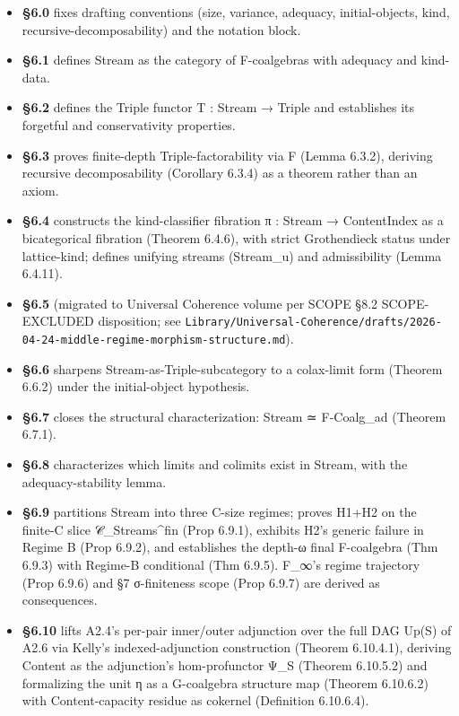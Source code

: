 \documentclass[11pt, openany]{book}
\begin{document}
\begin{itemize}
\item \textbf{§6.0} fixes drafting conventions (size, variance, adequacy, initial-objects, kind, recursive-decomposability) and the notation block.
\item \textbf{§6.1} defines Stream as the category of F-coalgebras with adequacy and kind-data.
\item \textbf{§6.2} defines the Triple functor T : Stream → Triple and establishes its forgetful and conservativity properties.
\item \textbf{§6.3} proves finite-depth Triple-factorability via F (Lemma 6.3.2), deriving recursive decomposability (Corollary 6.3.4) as a theorem rather than an axiom.
\item \textbf{§6.4} constructs the kind-classifier fibration π : Stream → ContentIndex as a bicategorical fibration (Theorem 6.4.6), with strict Grothendieck status under lattice-kind; defines unifying streams (Stream\_\allowbreak{}u) and admissibility (Lemma 6.4.11).
\item \textbf{§6.5} (migrated to Universal Coherence volume per SCOPE §8.2 SCOPE-EXCLUDED disposition; see \texttt{Library/Universal-Coherence/drafts/2026-04-24-middle-regime-morphism-structure.md}).
\item \textbf{§6.6} sharpens Stream-as-Triple-subcategory to a colax-limit form (Theorem 6.6.2) under the initial-object hypothesis.
\item \textbf{§6.7} closes the structural characterization: Stream ≃ F-Coalg\_\allowbreak{}ad (Theorem 6.7.1).
\item \textbf{§6.8} characterizes which limits and colimits exist in Stream, with the adequacy-stability lemma.
\item \textbf{§6.9} partitions Stream into three C-size regimes; proves H1+H2 on the finite-C slice 𝒞\_\allowbreak{}Streams\textasciicircum{}{fin} (Prop 6.9.1), exhibits H2's generic failure in Regime B (Prop 6.9.2), and establishes the depth-ω final F-coalgebra (Thm 6.9.3) with Regime-B conditional (Thm 6.9.5). F\_\allowbreak{}∞'s regime trajectory (Prop 6.9.6) and §7 σ-finiteness scope (Prop 6.9.7) are derived as consequences.
\item \textbf{§6.10} lifts A2.4's per-pair inner/outer adjunction over the full DAG Up(S) of A2.6 via Kelly's indexed-adjunction construction (Theorem 6.10.4.1), deriving Content as the adjunction's hom-profunctor Ψ\_\allowbreak{}S (Theorem 6.10.5.2) and formalizing the unit η as a G-coalgebra structure map (Theorem 6.10.6.2) with Content-capacity residue as cokernel (Definition 6.10.6.4).
\end{itemize}
\end{document}
